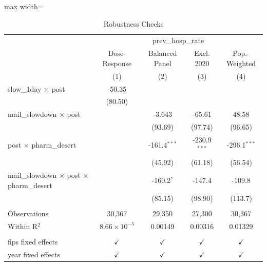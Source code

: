 
\begin{table}[htbp]
   \caption{\label{tab:robust} Robustness Checks}
   \bigskip
   \centering
   \begin{adjustbox}{max width=\textwidth}
   \begin{tabular}{lcccc}
      \toprule
       & \multicolumn{4}{c}{prev\_hosp\_rate}\\
                                                              & Dose-Response         & Balanced Panel & Excl. 2020     & Pop.-Weighted \\   
                                                              & (1)                   & (2)            & (3)            & (4)\\  
      \midrule 
      slow\_1day $\times$ post                                & -50.35                &                &                &   \\   
                                                              & (80.50)               &                &                &   \\   
      mail\_slowdown $\times$ post                            &                       & -3.643         & -65.61         & 48.58\\   
                                                              &                       & (93.69)        & (97.74)        & (96.65)\\   
      post $\times$ pharm\_desert                             &                       & -161.4$^{***}$ & -230.9$^{***}$ & -296.1$^{***}$\\   
                                                              &                       & (45.92)        & (61.18)        & (56.54)\\   
      mail\_slowdown $\times$ post $\times$ pharm\_desert     &                       & -160.2$^{*}$   & -147.4         & -109.8\\   
                                                              &                       & (85.15)        & (98.90)        & (113.7)\\   
       \\
      Observations                                            & 30,367                & 29,350         & 27,300         & 30,367\\  
      Within R$^2$                                            & $8.66\times 10^{-5}$  & 0.00149        & 0.00316        & 0.01329\\  
       \\
      fips fixed effects                                      & $\checkmark$          & $\checkmark$   & $\checkmark$   & $\checkmark$\\   
      year fixed effects                                      & $\checkmark$          & $\checkmark$   & $\checkmark$   & $\checkmark$\\   
      \bottomrule
   \end{tabular}
   \end{adjustbox}


\end{table}
